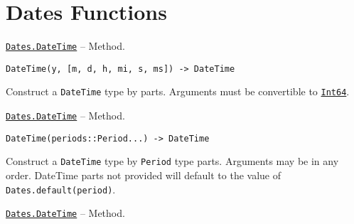 \hypertarget{17975207601808486978}{}


\section{Dates Functions}


\hypertarget{1328456258006961178}{} 
\hyperlink{1328456258006961178}{\texttt{Dates.DateTime}}  -- {Method.}

\begin{adjustwidth}{2em}{0pt}


\begin{verbatim}
DateTime(y, [m, d, h, mi, s, ms]) -> DateTime
\end{verbatim}

Construct a \texttt{DateTime} type by parts. Arguments must be convertible to \hyperlink{7720564657383125058}{\texttt{Int64}}.



\end{adjustwidth}
\hypertarget{8234829693150521940}{} 
\hyperlink{8234829693150521940}{\texttt{Dates.DateTime}}  -- {Method.}

\begin{adjustwidth}{2em}{0pt}


\begin{verbatim}
DateTime(periods::Period...) -> DateTime
\end{verbatim}

Construct a \texttt{DateTime} type by \texttt{Period} type parts. Arguments may be in any order. DateTime parts not provided will default to the value of \texttt{Dates.default(period)}.



\end{adjustwidth}
\hypertarget{18390475731552157559}{} 
\hyperlink{18390475731552157559}{\texttt{Dates.DateTime}}  -- {Method.}

